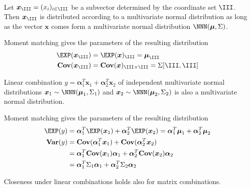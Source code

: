 \documentclass[landscape,footrule]{foils}
\renewcommand{\vec}[1]{\boldsymbol{#1}}
\renewcommand{\VAR}{\mathbf{Var}}
\newcommand{\COV}{\mathbf{Cov}}
\begin{document}
\titlefoil


\





Let $\vec{x}_{\III}=(x_i)_{i\in\III}$ be a subvector determined by the coordinate set $\III$.
Then $\vec{x}_{\III}$ is distributed according to a multivariate normal distribution as long as 
the vector $\vec{x}$ comes form a multivariate normal distribution $\NNN(\vec{\mu},\Sigma)$.

\begin{triangles}
\item Moment matching gives the parameters of the resulting distribution 
\begin{align*}
\EXP(\vec{x}_{\III})&= \EXP(\vec{x})_{\III}=\vec{\mu}_{\III} \\
\COV(\vec{x}_{\III})&=\COV(\vec{x})_{\III\times \III}=\Sigma[\III, \III]
\end{align*}
\end{triangles}


Linear combination $y=\vec{\alpha}_1^T \vec{x}_1+\vec{\alpha}_2^T\vec{x}_2$ of independent multivariate normal distributions $\vec{x}_1\sim\NNN(\vec{\mu}_1,\Sigma_1)$ and $\vec{x}_2\sim\NNN(\vec{\mu}_2,\Sigma_2)$ is also  a multivariate normal distribution.

\begin{triangles}
\item Moment matching gives the parameters of the resulting distribution 
\begin{align*}
\EXP(y)&= \vec{\alpha}_1^T\EXP(\vec{x}_1)+\vec{\alpha}_2^T\EXP(\vec{x}_2)=
\vec{\alpha}_1^T\vec{\mu}_1+\vec{\alpha}_2^T\vec{\mu}_2\\
\VAR(y)&=\COV(\vec{\alpha}_1^T \vec{x}_1) + \COV(\vec{\alpha}_2^T \vec{x}_2)\\
&=\vec{\alpha}_1^T \COV(\vec{x}_1)\vec{\alpha}_1+ \vec{\alpha}_2^T \COV(\vec{x}_2)\vec{\alpha}_2\\
&=\vec{\alpha}_1^T \Sigma_1\vec{\alpha}_1+ \vec{\alpha}_2^T \Sigma_2\vec{\alpha}_2
\end{align*}
\item Closeness under linear combinations holds also for matrix combinations. 
\end{triangles}
\end{document}
